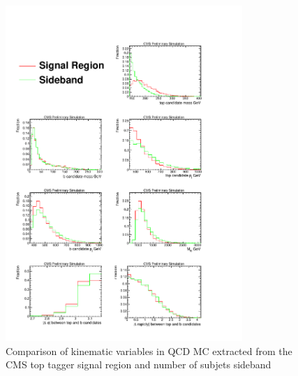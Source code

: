 \begin{figure}[Htcb]
\centering
\includegraphics[width=0.8\textwidth]{AN-13-004/figs/SBtoSR.pdf}
\caption{Comparison of kinematic variables in QCD MC extracted from the CMS top tagger signal region and number of subjets sideband}
\label{figs:SBtoSR}
\end{figure}








